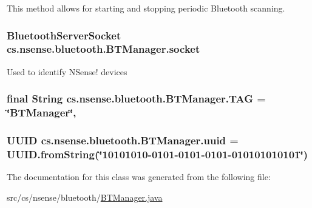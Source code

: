 This method allows for starting and stopping periodic Bluetooth scanning. \hypertarget{classcs_1_1nsense_1_1bluetooth_1_1_b_t_manager_a8d41fad664a009d3561fd44ec0ce4b20}{
\subsubsection[{socket}]{\setlength{\rightskip}{0pt plus 5cm}Bluetooth\-Server\-Socket cs.\-nsense.\-bluetooth.\-B\-T\-Manager.\-socket\hspace{0.3cm}{\ttfamily [private]}}}\label{classcs_1_1nsense_1_1bluetooth_1_1_b_t_manager_a8d41fad664a009d3561fd44ec0ce4b20}
Used to identify N\-Sense! devices \hypertarget{classcs_1_1nsense_1_1bluetooth_1_1_b_t_manager_adf32283e5fe4dd2dbc98f9f04ac68751}{
\subsubsection[{T\-A\-G}]{\setlength{\rightskip}{0pt plus 5cm}final String cs.\-nsense.\-bluetooth.\-B\-T\-Manager.\-T\-A\-G = \char`\"{}B\-T\-Manager\char`\"{}\hspace{0.3cm}{\ttfamily [static]}, {\ttfamily [private]}}}\label{classcs_1_1nsense_1_1bluetooth_1_1_b_t_manager_adf32283e5fe4dd2dbc98f9f04ac68751}
\hypertarget{classcs_1_1nsense_1_1bluetooth_1_1_b_t_manager_a818226909573656acd53ca0a64992d01}{
\subsubsection[{uuid}]{\setlength{\rightskip}{0pt plus 5cm}U\-U\-I\-D cs.\-nsense.\-bluetooth.\-B\-T\-Manager.\-uuid = U\-U\-I\-D.\-from\-String(\char`\"{}10101010-\/0101-\/0101-\/0101-\/010101010101\char`\"{})\hspace{0.3cm}{\ttfamily [private]}}}\label{classcs_1_1nsense_1_1bluetooth_1_1_b_t_manager_a818226909573656acd53ca0a64992d01}


The documentation for this class was generated from the following file\-:\begin{DoxyCompactItemize}
\item 
src/cs/nsense/bluetooth/\hyperlink{_b_t_manager_8java}{B\-T\-Manager.\-java}\end{DoxyCompactItemize}
